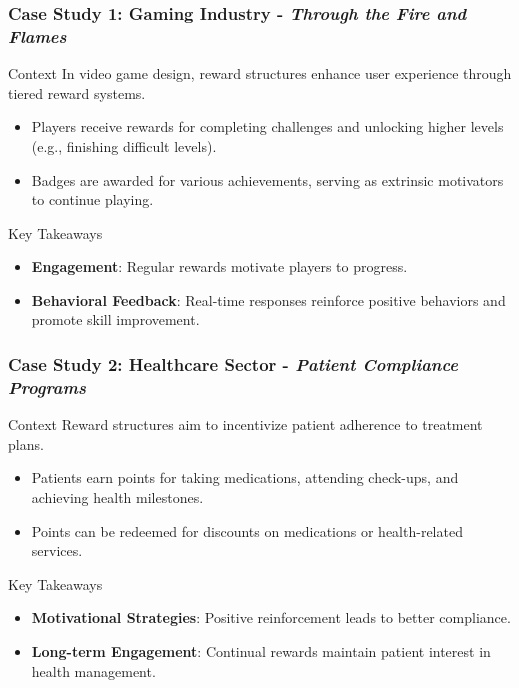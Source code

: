 \documentclass[aspectratio=169]{beamer}
\begin{document}
\begin{frame}[fragile]
    \frametitle{Case Study 1: Gaming Industry - \textit{Through the Fire and Flames}}
    \begin{block}{Context}
        In video game design, reward structures enhance user experience through tiered reward systems.
    \end{block}

    \begin{itemize}
        \item Players receive rewards for completing challenges and unlocking higher levels (e.g., finishing difficult levels).
        \item Badges are awarded for various achievements, serving as extrinsic motivators to continue playing.
    \end{itemize}

    \begin{block}{Key Takeaways}
        \begin{itemize}
            \item \textbf{Engagement}: Regular rewards motivate players to progress.
            \item \textbf{Behavioral Feedback}: Real-time responses reinforce positive behaviors and promote skill improvement.
        \end{itemize}
    \end{block}
\end{frame}

\begin{frame}[fragile]
    \frametitle{Case Study 2: Healthcare Sector - \textit{Patient Compliance Programs}}
    \begin{block}{Context}
        Reward structures aim to incentivize patient adherence to treatment plans.
    \end{block}

    \begin{itemize}
        \item Patients earn points for taking medications, attending check-ups, and achieving health milestones.
        \item Points can be redeemed for discounts on medications or health-related services.
    \end{itemize}

    \begin{block}{Key Takeaways}
        \begin{itemize}
            \item \textbf{Motivational Strategies}: Positive reinforcement leads to better compliance.
            \item \textbf{Long-term Engagement}: Continual rewards maintain patient interest in health management.
        \end{itemize}
    \end{block}
\end{frame}
\end{document}
